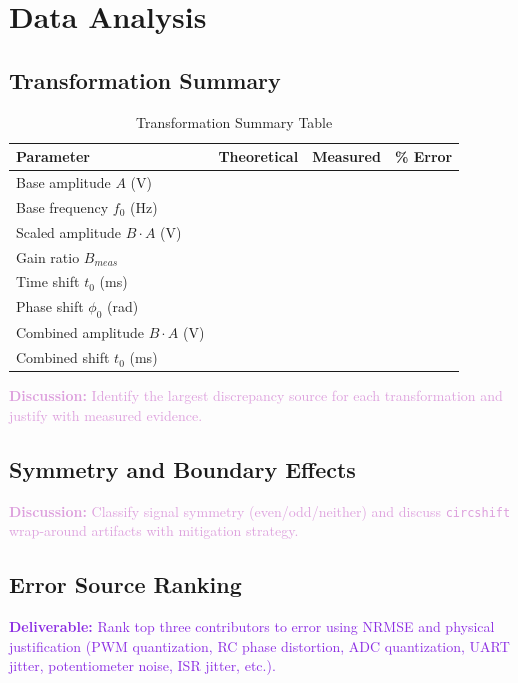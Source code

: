 \documentclass[11pt,letterpaper]{article}
\providecommand{\disECE}[1]{\textcolor{Plum}{\textbf{Discussion:} #1}}
\providecommand{\delECE}[1]{\textcolor{BlueViolet}{\textbf{Deliverable:} #1}}
\begin{document}
\section{Data Analysis}

\subsection{Transformation Summary}
\begin{table}[H]
    \centering
    \caption{Transformation Summary Table}
    \begin{tabularx}{\linewidth}{l X X X}
    \toprule
    \textbf{Parameter} & \textbf{Theoretical} & \textbf{Measured} & \textbf{\% Error}\\
    \midrule
    Base amplitude $A$ (V) & & & \\
    Base frequency $f_0$ (Hz) & & & \\
    Scaled amplitude $B\cdot A$ (V) & & & \\
    Gain ratio $B_{meas}$ & & & \\
    Time shift $t_0$ (ms) & & & \\
    Phase shift $\phi_0$ (rad) & & & \\
    Combined amplitude $B\cdot A$ (V) & & & \\
    Combined shift $t_0$ (ms) & & & \\
    \bottomrule
    \end{tabularx}
\end{table}

\disECE{Identify the largest discrepancy source for each transformation and justify with measured evidence.}

\subsection{Symmetry and Boundary Effects}
\disECE{Classify signal symmetry (even/odd/neither) and discuss \texttt{circshift} wrap-around artifacts with mitigation strategy.}

\subsection{Error Source Ranking}
\delECE{Rank top three contributors to error using NRMSE and physical justification (PWM quantization, RC phase distortion, ADC quantization, UART jitter, potentiometer noise, ISR jitter, etc.).}

\clearpage
\end{document}
